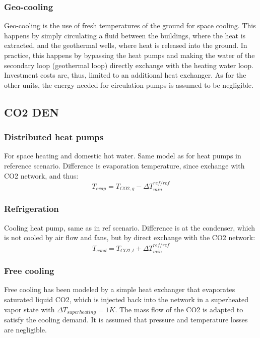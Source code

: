\documentclass{article}
\begin{document}
\subsubsection{Geo-cooling}
Geo-cooling is the use of fresh temperatures of the ground for space cooling. This happens by simply circulating a fluid between the buildings, where the heat is extracted, and the geothermal wells, where heat is released into the ground. In practice, this happens by bypassing the heat pumps and making the water of the secondary loop (geothermal loop) directly exchange with the heating water loop. Investment costs are, thus, limited to an additional heat exchanger. As for the other units, the energy needed for circulation pumps is assumed to be negligible. 


\subsection{CO2 DEN}

\subsubsection{Distributed heat pumps}
For space heating and domestic hot water.
Same model as for heat pumps in reference scenario. 
Difference is evaporation temperature, since exchange with CO2 network, and thus:
\begin{equation}
    T_{evap} = T_{CO2,g} - \Delta T_{min}^{ref/ref}
\end{equation}

\subsubsection{Refrigeration}
Cooling heat pump, same as in ref scenario.
Difference is at the condenser, which is not cooled by air flow and fans, but by direct exchange with the CO2 network:
\begin{equation}
    T_{cond} = T_{CO2,l} + \Delta T_{min}^{ref/ref}
\end{equation}

\subsubsection{Free cooling}
Free cooling has been modeled by a simple heat exchanger that evaporates saturated liquid CO2, which is injected back into the network in a superheated vapor state with $\Delta T_{superheating} = 1K$. The mass flow of the CO2 is adapted to satisfy the cooling demand. It is assumed that pressure and temperature losses are negligible.
\end{document}
